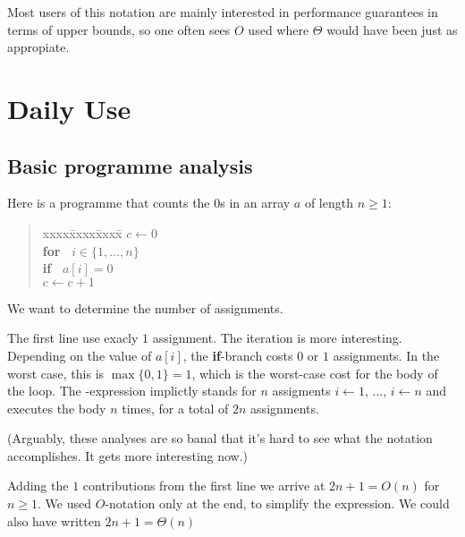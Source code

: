 \documentclass{tstextbook}
\begin{document}
Most users of this notation are mainly interested in performance guarantees in terms of upper bounds, so one often sees $O$ used where $\Theta$ would have been just as appropiate.



\section{Daily Use}

\subsection{Basic programme analysis}


\begin{example}
Here is a programme that counts the $0$s in an array $a$ of length $n\geq 1$:

\begin{quotation}
  \begin{tabbing}
    xxxx\=xxxx\=xxxx\=\kill
    $c \leftarrow{} 0$\\
    \textbf{for\ } $i\in \{1,\ldots,n\}$\\
    \> \textbf{if\ } $a[i] = 0$\\
    \>\> $c\leftarrow{} c + 1$\\
  \end{tabbing}
\end{quotation}

We want to determine the number of assignments.

The first line use exacly $1$ assignment.
The iteration is more interesting.
Depending on the value of $a[i]$, the \textbf{if}-branch costs $0$ or $1$ assignments.
In the worst case, this is $\max\{0,1\} = 1$, which is the worst-case cost for the body of the loop.
The -expression implictly stands for $n$ assigments $i\leftarrow 1$, $\ldots$, $i \leftarrow n$ and executes the body $n$ times, for a total of $2n$ assignments.

(Arguably, these analyses are so banal that it's hard to see what the notation accomplishes.
It gets more interesting now.)

Adding the $1$ contributions from the first line we arrive at $2n+1=  O(n)$ for $n\geq 1$.
We used $O$-notation only at the end, to simplify the expression.
We could also have written  $2n+1= \Theta(n)$
\end{example}
\end{document}
